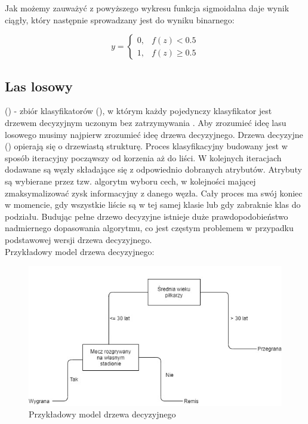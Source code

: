 Jak możemy zauważyć z powyższego wykresu funkcja sigmoidalna daje wynik ciągły, który następnie sprowadzany jest do wyniku binarnego:

\[
y = 
    \begin{cases}
            0,& f(z) < 0.5\\
            1,& f(z) \ge 0.5
    \end{cases}
\]

\newpage
\subsection{Las losowy}
 () - zbiór klasyfikatorów (), w którym każdy pojedynczy klasyfikator jest drzewem decyzyjnym uczonym bez zatrzymywania \cite{PPlonski}. Aby zrozumieć ideę lasu losowego musimy najpierw zrozumieć ideę drzewa decyzyjnego. Drzewa decyzyjne () opierają się o drzewiastą strukturę. Proces klasyfikacyjny budowany jest w sposób iteracyjny począwszy od korzenia aż do liści. W kolejnych iteracjach dodawane są węzły składające się z odpowiednio dobranych atrybutów. Atrybuty są wybierane przez tzw. algorytm wyboru cech, w kolejności mającej zmaksymalizować zysk informacyjny z danego węzła. Cały proces ma swój koniec w momencie, gdy wszystkie liście są w tej samej klasie lub gdy zabraknie klas do podziału. Budując pełne drzewo decyzyjne istnieje duże prawdopodobieństwo nadmiernego dopasowania algorytmu, co jest częstym problemem w przypadku podstawowej wersji drzewa decyzyjnego. \cite{MGrzyb}\\

Przykładowy model drzewa decyzyjnego:
\begin{figure}[h] 
        \includegraphics[width=14cm]{figures/decTree.jpg}
        \caption{Przykładowy model drzewa decyzyjnego}
\end{figure}

